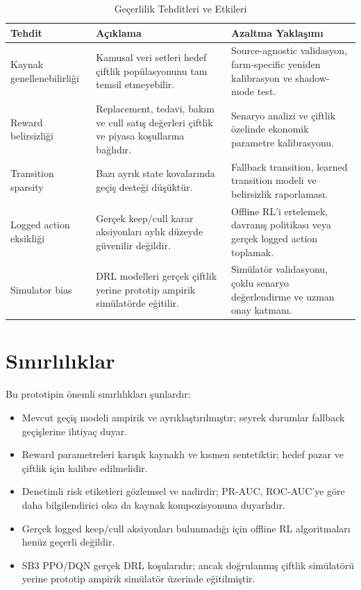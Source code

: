 \documentclass[conference]{IEEEtran}
\begin{document}
\begin{table}[!t]
\caption{Geçerlilik Tehditleri ve Etkileri}
\label{tab:threats}
\centering
\begin{tabular}{p{}p{}p{}}
\toprule
Tehdit & Açıklama & Azaltma Yaklaşımı \\
\midrule
Kaynak genellenebilirliği & Kamusal veri setleri hedef çiftlik popülasyonunu
tam temsil etmeyebilir. & Source-agnostic validasyon, farm-specific yeniden
kalibrasyon ve shadow-mode test. \\
Reward belirsizliği & Replacement, tedavi, bakım ve cull satış değerleri
çiftlik ve piyasa koşullarına bağlıdır. & Senaryo analizi ve çiftlik özelinde
ekonomik parametre kalibrasyonu. \\
Transition sparsity & Bazı ayrık state kovalarında geçiş desteği düşüktür. &
Fallback transition, learned transition modeli ve belirsizlik raporlaması. \\
Logged action eksikliği & Gerçek keep/cull karar aksiyonları aylık düzeyde
güvenilir değildir. & Offline RL'i ertelemek, davranış politikası veya gerçek
logged action toplamak. \\
Simulator bias & DRL modelleri gerçek çiftlik yerine prototip ampirik
simülatörde eğitilir. & Simülatör validasyonu, çoklu senaryo değerlendirme ve
uzman onay katmanı. \\
\bottomrule
\end{tabular}
\end{table}

\section{Sınırlılıklar}
Bu prototipin önemli sınırlılıkları şunlardır:
\begin{itemize}
    \item Mevcut geçiş modeli ampirik ve ayrıklaştırılmıştır; seyrek durumlar
    fallback geçişlerine ihtiyaç duyar.
    \item Reward parametreleri karışık kaynaklı ve kısmen sentetiktir; hedef
    pazar ve çiftlik için kalibre edilmelidir.
    \item Denetimli risk etiketleri gözlemsel ve nadirdir; PR-AUC, ROC-AUC'ye
    göre daha bilgilendirici olsa da kaynak kompozisyonuna duyarlıdır.
    \item Gerçek logged keep/cull aksiyonları bulunmadığı için offline RL
    algoritmaları henüz geçerli değildir.
    \item SB3 PPO/DQN gerçek DRL koşularıdır; ancak doğrulanmış çiftlik
    simülatörü yerine prototip ampirik simülatör üzerinde eğitilmiştir.
\end{itemize}
\end{document}
